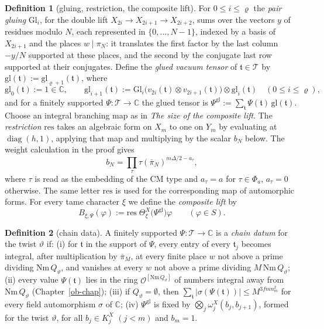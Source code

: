 \documentclass[reqno]{amsart}
\newcounter{chap}
\theoremstyle{definition}
\newtheorem{definition}{Definition}[section]
\theoremstyle{plain}
\newcommand{\C}{\mathbb{C}}
\newcommand{\Oc}{\mathcal{O}}
\newcommand{\Tc}{\mathcal{T}}
\begin{document}
\begin{definition}[gluing, restriction, the composite lift]\label{def:composite}
For \(0 \le i \le \varrho\) the \emph{pair gluing} \(\mathrm{Gl}_i\), for the double lift \(X_{2i} \to X_{2i+1} \to X_{2i+2}\), sums over the vectors \(y\) of residues modulo \(N\), each represented in \(\{0, \dots, N-1\}\), indexed by a basis of \(X_{2i+1}\) and the places \(w \mid \pi_N\): it translates the first factor by the last column \(-y/N\) supported at these places, and the second by the conjugate last row supported at their conjugates.  Define the \emph{glued vacuum tensor} of \(\mathfrak t \in \Tc\) by \(\mathrm{gl}(\mathfrak t) := \mathrm{gl}_{\varrho+1}(\mathfrak t)\), where
\[
  \mathrm{gl}_0(\mathfrak t) := 1 \in \C , \qquad
  \mathrm{gl}_{i+1}(\mathfrak t) := \mathrm{Gl}_i\bigl(v_{2i}(\mathfrak t)\otimes v_{2i+1}(\mathfrak t)\bigr) \otimes \mathrm{gl}_i(\mathfrak t) \quad (0\le i\le\varrho),
\]
and for a finitely supported \(\Psi \colon \Tc \to \C\) the glued tensor is \(\Psi^{\mathrm{gl}} := \sum_{\mathfrak t} \Psi(\mathfrak t)\,\mathrm{gl}(\mathfrak t)\).  Choose an integral branching map as in \emph{The size of the composite lift}.  The \emph{restriction} \(\mathrm{res}\) takes an algebraic form on \(X_m\) to one on \(Y_m\) by evaluating at \(\operatorname{diag}(h,1)\), applying that map and multiplying by the scalar \(b_N\) below.  The weight calculation in the proof gives
\[
  b_N = \prod_\tau \tau(\bar\pi_N)^{m\Delta/2 - a_\tau},
\]
where \(\tau\) is read as the embedding of the CM type and \(a_\tau = a\) for \(\tau \in \Phi_a\), \(a_\tau = 0\) otherwise.  The same letter \(\mathrm{res}\) is used for the corresponding map of automorphic forms.  For every tame character \(\xi\) we define the \emph{composite lift} by
\[
  B_{\xi,\Psi}(\varphi) := \mathrm{res}\;\Theta^X_\xi\bigl(\Psi^{\mathrm{gl}}\bigr)\varphi \qquad (\varphi \in S).
\]
\end{definition}

\begin{definition}[chain data]\label{def:chain-datum}
A finitely supported \(\Psi \colon \Tc \to \C\) is a \emph{chain datum} for the twist \(\vartheta\) if: (i) for \(\mathfrak t\) in the support of \(\Psi\), every entry of every \(\mathfrak t_j\) becomes integral, after multiplication by \(\bar\pi_M\), at every finite place \(w\) not above a prime dividing \(\mathrm{Nm}\,Q_\vartheta\), and vanishes at every \(w\) not above a prime dividing \(M\,\mathrm{Nm}\,Q_\vartheta\); (ii) every value \(\Psi(\mathfrak t)\) lies in the ring \(\Oc^{[\mathrm{Nm}\,Q_\vartheta]}\) of numbers integral away from \(\mathrm{Nm}\,Q_\vartheta\) (Chapter~\ref{ob-chap}); (iii) if \(Q_\vartheta = \emptyset\), then \(\sum_{\mathfrak t} \lvert\sigma(\Psi(\mathfrak t))\rvert \le M^{3fmn_m^2}\) for every field automorphism \(\sigma\) of \(\C\); (iv) \(\Psi^{\mathrm{gl}}\) is fixed by \(\bigotimes_j \omega^X_j(b_j, b_{j+1})\), formed for the twist \(\vartheta\), for all \(b_j \in K^X_j\) \((j < m)\) and \(b_m = 1\).
\end{definition}
\end{document}
